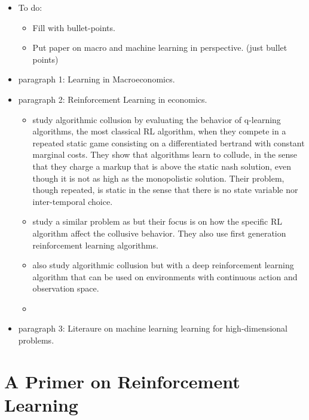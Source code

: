 \documentclass[11pt,english]{article}
\begin{document}
	\begin{itemize}
			
		\item {\color{red} To do: 
			
			\begin{itemize}
				\item Fill with bullet-points. 
				\item Put paper on macro and machine learning in perspective. (just bullet points)
		\end{itemize}}
	
		\item paragraph 1: Learning in Macroeconomics. \medskip
		
		\item paragraph 2: Reinforcement Learning in economics. \medskip
		
		\begin{itemize}
			\item \citet{calvano2020} study algorithmic collusion by evaluating the behavior of q-learning algorithms, the most classical RL algorithm, when they compete in a repeated static game consisting on a differentiated bertrand with constant marginal costs. They show that algorithms learn to collude, in the sense that they charge a markup that is above the static nash solution, even though it is not as high as the monopolistic solution. Their problem, though repeated, is static in the sense that there is no state variable nor inter-temporal choice. 
			
			\item \citet{asker2021} study a similar problem as \citet{calvano2020} but their focus is on how the specific RL algorithm affect the collusive behavior. They also use first generation reinforcement learning algorithms.
			
			\item \citet{graf2021} also study algorithmic collusion but with a deep reinforcement learning algorithm that can be used on environments with continuous action and observation space.
			
			\item 
			
		\end{itemize}
		
		\item paragraph 3: Literaure on machine learning learning for high-dimensional problems.
	\end{itemize}
	

\section{A Primer on Reinforcement Learning}
\end{document}
